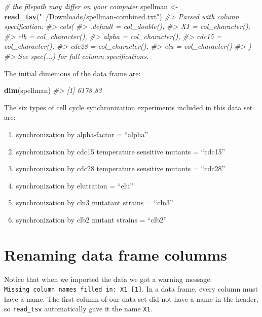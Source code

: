 \documentclass[]{book}
\newenvironment{Shaded}{\begin{snugshade}}{\end{snugshade}}
\newcommand{\CommentTok}[1]{\textcolor[rgb]{0.56,0.35,0.01}{\textit{#1}}}
\newcommand{\KeywordTok}[1]{\textcolor[rgb]{0.13,0.29,0.53}{\textbf{#1}}}
\newcommand{\NormalTok}[1]{#1}
\newcommand{\StringTok}[1]{\textcolor[rgb]{0.31,0.60,0.02}{#1}}
\providecommand{\tightlist}{%
  \setlength{\itemsep}{0pt}\setlength{\parskip}{0pt}}
\theoremstyle{definition}
\theoremstyle{definition}
\theoremstyle{definition}
\theoremstyle{remark}
\begin{document}
\begin{Shaded}
\begin{Highlighting}[]
\CommentTok{# the filepath may differ on your computer}
\NormalTok{spellman <-}\StringTok{ }\KeywordTok{read_tsv}\NormalTok{(}\StringTok{"~/Downloads/spellman-combined.txt"}\NormalTok{)}
\CommentTok{#> Parsed with column specification:}
\CommentTok{#> cols(}
\CommentTok{#>   .default = col_double(),}
\CommentTok{#>   X1 = col_character(),}
\CommentTok{#>   clb = col_character(),}
\CommentTok{#>   alpha = col_character(),}
\CommentTok{#>   cdc15 = col_character(),}
\CommentTok{#>   cdc28 = col_character(),}
\CommentTok{#>   elu = col_character()}
\CommentTok{#> )}
\CommentTok{#> See spec(...) for full column specifications.}
\end{Highlighting}
\end{Shaded}

The initial dimenions of the data frame are:

\begin{Shaded}
\begin{Highlighting}[]
\KeywordTok{dim}\NormalTok{(spellman)}
\CommentTok{#> [1] 6178   83}
\end{Highlighting}
\end{Shaded}

The six types of cell cycle synchronization experiments included in this
data set are:

\begin{enumerate}
\def\labelenumi{\arabic{enumi}.}
\tightlist
\item
  synchronization by alpha-factor = ``alpha''
\item
  synchronization by cdc15 temperature sensitive mutants = ``cdc15''
\item
  synchronization by cdc28 temperature sensitive mutants = ``cdc28''
\item
  synchronization by elutration = ``elu''
\item
  synchronization by cln3 mutatant strains = ``cln3''
\item
  synchronization by clb2 mutant strains = ``clb2''
\end{enumerate}

\hypertarget{renaming-data-frame-columms}{%
\section{Renaming data frame
columms}\label{renaming-data-frame-columms}}

Notice that when we imported the data we got a warning message:
\texttt{Missing\ column\ names\ filled\ in:\ \textquotesingle{}X1\textquotesingle{}\ {[}1{]}}.
In a data frame, every column must have a name. The first column of our
data set did not have a name in the header, so \texttt{read\_tsv}
automatically gave it the name \texttt{X1}.
\end{document}
